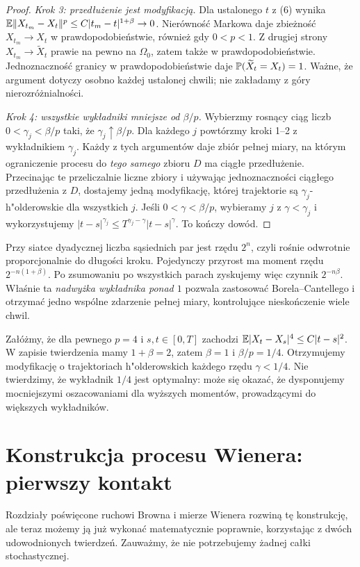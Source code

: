 \begin{proof}
\emph{Krok 3: przedłużenie jest modyfikacją.}
Dla ustalonego $t$ z (6) wynika
$\mathbb{E}\lVert X_{t_m}-X_t\rVert^{p}\le C|t_m-t|^{1+\beta}\to0$.
Nierówność Markowa daje zbieżność $X_{t_m}\to X_t$
w prawdopodobieństwie, również gdy $0<p<1$.
Z drugiej strony $X_{t_m}\to\widetilde X_t$
prawie na pewno na $\Omega_0$, zatem także w
prawdopodobieństwie. Jednoznaczność granicy w
prawdopodobieństwie daje $\mathbb{P}(\widetilde X_t=X_t)=1$.
Ważne, że argument dotyczy osobno każdej ustalonej chwili;
nie zakładamy z góry nierozróżnialności.

\emph{Krok 4: wszystkie wykładniki mniejsze od $\beta/p$.}
Wybierzmy rosnący ciąg liczb
$0<\gamma_j<\beta/p$ taki, że
$\gamma_j\uparrow\beta/p$. Dla każdego $j$
powtórzmy kroki 1--2 z wykładnikiem $\gamma_j$.
Każdy z tych argumentów daje zbiór pełnej miary,
na którym ograniczenie procesu do \emph{tego samego}
zbioru $D$ ma ciągłe przedłużenie.
Przecinając te przeliczalnie liczne zbiory i używając
jednoznaczności ciągłego przedłużenia z $D$,
dostajemy jedną modyfikację, której trajektorie są
$\gamma_j$-h"olderowskie dla wszystkich $j$.
Jeśli $0<\gamma<\beta/p$, wybieramy $j$ z
$\gamma<\gamma_j$ i wykorzystujemy
$|t-s|^{\gamma_j}\le T^{\gamma_j-\gamma}|t-s|^\gamma$.
To kończy dowód.
\end{proof}

\begin{uwaga}
Przy siatce dyadycznej liczba sąsiednich par jest rzędu
$2^n$, czyli rośnie odwrotnie proporcjonalnie do długości
kroku. Pojedynczy przyrost ma moment rzędu
$2^{-n(1+\beta)}$. Po zsumowaniu po wszystkich parach
zyskujemy więc czynnik $2^{-n\beta}$.
Właśnie ta \emph{nadwyżka wykładnika ponad $1$}
pozwala zastosować Borela--Cantellego i otrzymać
jedno wspólne zdarzenie pełnej miary, kontrolujące
nieskończenie wiele chwil.
\end{uwaga}

\begin{przyklad}
Załóżmy, że dla pewnego $p=4$ i $s,t\in[0,T]$
zachodzi $\mathbb{E}|X_t-X_s|^4\le C|t-s|^2$.
W zapisie twierdzenia mamy $1+\beta=2$, zatem $\beta=1$
i $\beta/p=1/4$. Otrzymujemy modyfikację o trajektoriach
h"olderowskich każdego rzędu $\gamma<1/4$.
Nie twierdzimy, że wykładnik $1/4$ jest optymalny:
może się okazać, że dysponujemy mocniejszymi
oszacowaniami dla wyższych momentów, prowadzącymi do
większych wykładników.
\end{przyklad}

\section{Konstrukcja procesu Wienera: pierwszy kontakt}
Rozdziały poświęcone ruchowi Browna i mierze Wienera
rozwiną tę konstrukcję, ale teraz możemy ją już wykonać
matematycznie poprawnie, korzystając z dwóch udowodnionych
twierdzeń. Zauważmy, że nie potrzebujemy żadnej całki
stochastycznej.

